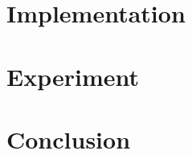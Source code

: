 \documentclass[12pt,dvips]{report}
\begin{document}
\chapter{Implementation}

\chapter{Experiment}

\chapter{Conclusion}

%
%

%

\end{document}
